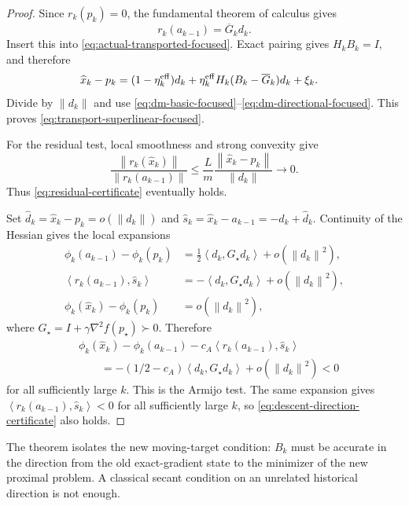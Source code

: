 \documentclass[10pt,leqno]{amsart}
\numberwithin{equation}{section}
\numberwithin{algorithm}{section}
\theoremstyle{remark}
\newcommand{\norm}[1]{\left\lVert #1 \right\rVert}
\newcommand{\ip}[2]{\left\langle #1,#2 \right\rangle}
\newcommand{\grad}{\nabla}
\begin{document}
\begin{proof}
Since $r_k(p_k)=0$, the fundamental theorem of calculus gives
\begin{equation}
\label{eq:mean-hessian-focused}
    r_k(a_{k-1})=\overline G_kd_k.
\end{equation}
Insert this into \eqref{eq:actual-transported-focused}.  Exact pairing gives $H_kB_k=I$, and therefore
\[
\begin{aligned}
    \widehat x_k-p_k
    ={}&(1-\eta_k^{\rm eff})d_k
      +\eta_k^{\rm eff}H_k(B_k-\overline G_k)d_k+\xi_k.
\end{aligned}
\]
Divide by $\norm{d_k}$ and use \eqref{eq:dm-basic-focused}--\eqref{eq:dm-directional-focused}.  This proves \eqref{eq:transport-superlinear-focused}.

For the residual test, local smoothness and strong convexity give
\[
    \frac{\norm{r_k(\widehat x_k)}}{\norm{r_k(a_{k-1})}}
    \le \frac{L}{m}
       \frac{\norm{\widehat x_k-p_k}}{\norm{d_k}}
    \longrightarrow0.
\]
Thus \eqref{eq:residual-certificate} eventually holds.

Set $\widehat d_k=\widehat x_k-p_k=o(\norm{d_k})$ and
$\widehat s_k=\widehat x_k-a_{k-1}=-d_k+\widehat d_k$.  Continuity of the Hessian gives the local expansions
\[
\begin{aligned}
    \phi_k(a_{k-1})-\phi_k(p_k)
      &=\frac12\ip{d_k}{G_\star d_k}+o(\norm{d_k}^2),\\
    \ip{r_k(a_{k-1})}{\widehat s_k}
      &=-\ip{d_k}{G_\star d_k}+o(\norm{d_k}^2),\\
    \phi_k(\widehat x_k)-\phi_k(p_k)
      &=o(\norm{d_k}^2),
\end{aligned}
\]
where $G_\star=I+\gamma\grad^2f(p_\star)\succ0$.  Therefore
\[
\begin{aligned}
&\phi_k(\widehat x_k)-\phi_k(a_{k-1})
   -c_A\ip{r_k(a_{k-1})}{\widehat s_k}\\
&\qquad
=-(1/2-c_A)\ip{d_k}{G_\star d_k}
  +o(\norm{d_k}^2)<0
\end{aligned}
\]
for all sufficiently large $k$.  This is the Armijo test.  The same expansion gives $\ip{r_k(a_{k-1})}{\widehat s_k}<0$ for all sufficiently large $k$, so \eqref{eq:descent-direction-certificate} also holds.
\end{proof}

The theorem isolates the new moving-target condition: $B_k$ must be accurate in the direction from the old exact-gradient state to the minimizer of the new proximal problem.  A classical secant condition on an unrelated historical direction is not enough.
\end{document}
